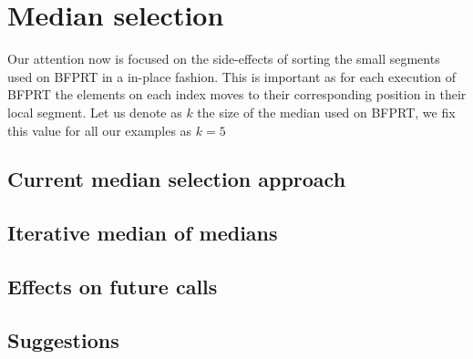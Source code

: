 \section{Median selection}

Our attention now is focused on the side-effects of sorting the small segments used on BFPRT in a in-place fashion. This is important as for each execution of BFPRT the elements on each index moves to their corresponding position in their local segment. Let us denote as $k$ the size of the median used on BFPRT, we fix this value for all our examples as $k=5$


\subsection{Current median selection approach}
\subsection{Iterative median of medians}
\subsection{Effects on future calls}
\subsection{Suggestions}

